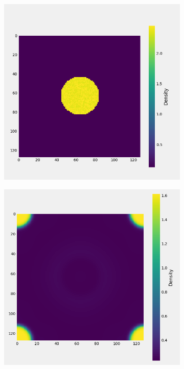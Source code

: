 \documentclass[]{article}
\begin{document}
\begin{figure}
\begin{subfigure}[t]{.49\textwidth}
	\centering
	\includegraphics[width=\textwidth]{figures/laplace_init.png}
	\caption{}
	\label{fig:laplace_init}
\end{subfigure}
\begin{subfigure}[t]{.49\textwidth}
	\centering
	\includegraphics[width=\textwidth]{figures/muphase_G_46.png}

\end{subfigure}
\end{figure}
\end{document}
